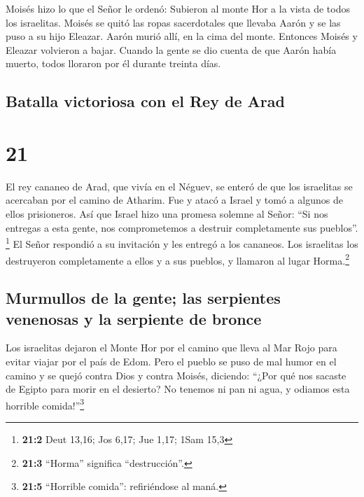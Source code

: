  Moisés hizo lo que el Señor le ordenó: Subieron al monte
Hor a la vista de todos los israelitas.  Moisés se quitó
las ropas sacerdotales que llevaba Aarón y se las puso a su hijo
Eleazar. Aarón murió allí, en la cima del monte. Entonces Moisés y
Eleazar volvieron a bajar.  Cuando la gente se dio cuenta
de que Aarón había muerto, todos lloraron por él durante treinta días.

\hypertarget{batalla-victoriosa-con-el-rey-de-arad}{%
\subsection{Batalla victoriosa con el Rey de
Arad}\label{batalla-victoriosa-con-el-rey-de-arad}}

\hypertarget{section-20}{%
\section{21}\label{section-20}}

 El rey cananeo de Arad, que vivía en el Néguev, se enteró
de que los israelitas se acercaban por el camino de Atharim. Fue y atacó
a Israel y tomó a algunos de ellos prisioneros.  Así que
Israel hizo una promesa solemne al Señor: ``Si nos entregas a esta
gente, nos comprometemos a destruir completamente sus pueblos''.
\footnote{\textbf{21:2} Deut 13,16; Jos 6,17; Jue 1,17; 1Sam 15,3}
 El Señor respondió a su invitación y les entregó a los
cananeos. Los israelitas los destruyeron completamente a ellos y a sus
pueblos, y llamaron al lugar Horma.\footnote{\textbf{21:3} ``Horma''
  significa ``destrucción''.}

\hypertarget{murmullos-de-la-gente-las-serpientes-venenosas-y-la-serpiente-de-bronce}{%
\subsection{Murmullos de la gente; las serpientes venenosas y la
serpiente de
bronce}\label{murmullos-de-la-gente-las-serpientes-venenosas-y-la-serpiente-de-bronce}}

 Los israelitas dejaron el Monte Hor por el camino que
lleva al Mar Rojo para evitar viajar por el país de Edom. Pero el pueblo
se puso de mal humor en el camino  y se quejó contra Dios
y contra Moisés, diciendo: ``¿Por qué nos sacaste de Egipto para morir
en el desierto? No tenemos ni pan ni agua, y odiamos esta horrible
comida!''\footnote{\textbf{21:5} ``Horrible comida'': refiriéndose al
  maná.}

